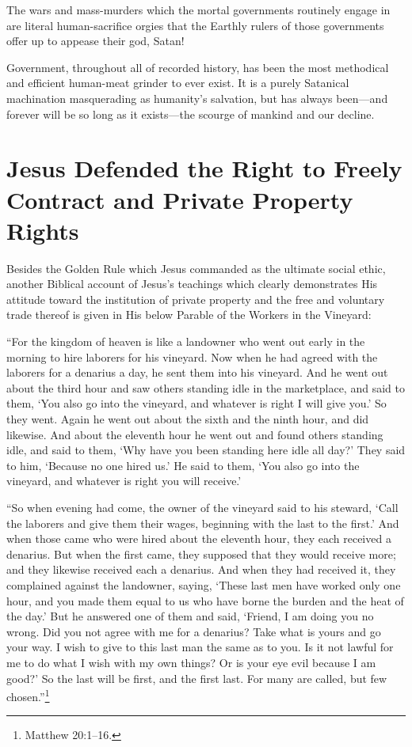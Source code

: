 \documentclass[letterpaper,12pt]{article}
\newenvironment{squotation}
  {\small\quotation}
  {\endquotation\normalsize}
\begin{document}
The wars and mass-murders which the mortal governments routinely engage in are literal human-sacrifice orgies that the Earthly rulers of those governments offer up to appease their god, Satan!

Government, throughout all of recorded history, has been the most methodical and efficient human-meat grinder to ever exist. It is a purely Satanical machination masquerading as humanity's salvation, but has always been---and forever will be so long as it exists---the scourge of mankind and our decline.

\section{Jesus Defended the Right to Freely Contract and Private Property Rights}
\label{sec:JesusDefendedTheRightToFreelyContractAndPrivatePropertyRights}

Besides the Golden Rule which Jesus commanded as the ultimate social ethic, another Biblical account of Jesus's teachings which clearly demonstrates His attitude toward the institution of private property and the free and voluntary trade thereof is given in His below Parable of the Workers in the Vineyard:

\begin{squotation}
``For the kingdom of heaven is like a landowner who went out early in the morning to hire laborers for his vineyard. Now when he had agreed with the laborers for a denarius a day, he sent them into his vineyard. And he went out about the third hour and saw others standing idle in the marketplace, and said to them, `You also go into the vineyard, and whatever is right I will give you.' So they went. Again he went out about the sixth and the ninth hour, and did likewise. And about the eleventh hour he went out and found others standing idle, and said to them, `Why have you been standing here idle all day?' They said to him, `Because no one hired us.' He said to them, `You also go into the vineyard, and whatever is right you will receive.'

``So when evening had come, the owner of the vineyard said to his steward, `Call the laborers and give them their wages, beginning with the last to the first.' And when those came who were hired about the eleventh hour, they each received a denarius. But when the first came, they supposed that they would receive more; and they likewise received each a denarius. And when they had received it, they complained against the landowner, saying, `These last men have worked only one hour, and you made them equal to us who have borne the burden and the heat of the day.' But he answered one of them and said, `Friend, I am doing you no wrong. Did you not agree with me for a denarius? Take what is yours and go your way. I wish to give to this last man the same as to you. Is it not lawful for me to do what I wish with my own things? Or is your eye evil because I am good?' So the last will be first, and the first last. For many are called, but few chosen.''\footnote{Matthew 20:1--16.}
\end{squotation}
\end{document}
